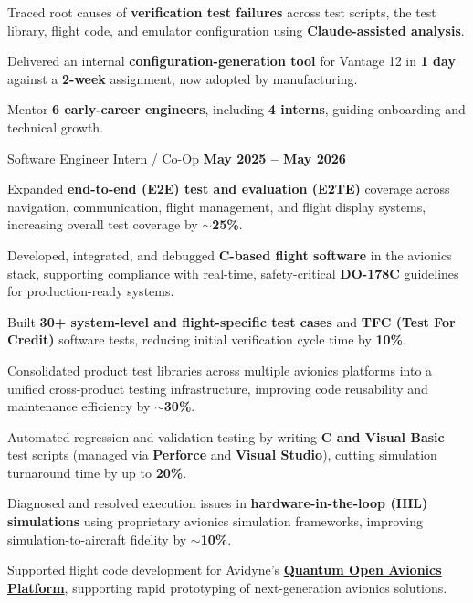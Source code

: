 \begin{cventries}
{\begin{cvitems}
  \item Traced root causes of \textbf{verification test failures} across test scripts, the test library, flight code, and emulator configuration using \textbf{Claude-assisted analysis}.
  \item Delivered an internal \textbf{configuration-generation tool} for Vantage 12 in \textbf{1 day} against a \textbf{2-week} assignment, now adopted by manufacturing.
  \item Mentor \textbf{6 early-career engineers}, including \textbf{4 interns}, guiding onboarding and technical growth.
\end{cvitems}
}
\cventry
{Software Engineer Intern / Co-Op}
{}
{}
{\textbf{May 2025 – May 2026}}
{
\begin{cvitems}
  \item Expanded \textbf{end-to-end (E2E) test and evaluation (E2TE)} coverage across navigation, communication, flight management, and flight display systems, increasing overall test coverage by $\sim$\textbf{25\%}.
  \item Developed, integrated, and debugged \textbf{C-based flight software} in the avionics stack, supporting compliance with real-time, safety-critical \textbf{DO-178C} guidelines for production-ready systems.
  \item Built \textbf{30+ system-level and flight-specific test cases} and \textbf{TFC (Test For Credit)} software tests, reducing initial verification cycle time by \textbf{10\%}.
  \item Consolidated product test libraries across multiple avionics platforms into a unified cross-product testing infrastructure, improving code reusability and maintenance efficiency by $\sim$\textbf{30\%}.
  \item Automated regression and validation testing by writing \textbf{C and Visual Basic} test scripts (managed via \textbf{Perforce} and \textbf{Visual Studio}), cutting simulation turnaround time by up to \textbf{20\%}.
  \item Diagnosed and resolved execution issues in \textbf{hardware-in-the-loop (HIL) simulations} using proprietary avionics simulation frameworks, improving simulation-to-aircraft fidelity by $\sim$\textbf{10\%}.
  \item Supported flight code development for Avidyne’s \href{https://quantum.avidyne.com/}{\textbf{Quantum Open Avionics Platform}}, supporting rapid prototyping of next-generation avionics solutions.
\end{cvitems}
}
\end{cventries}
